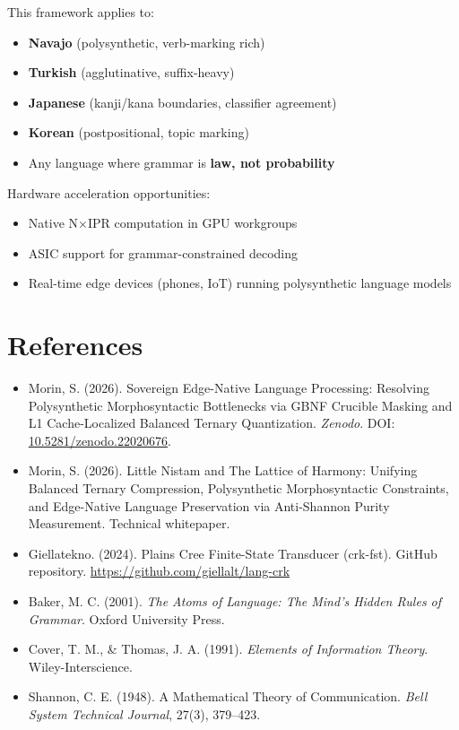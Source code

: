\documentclass[11pt,oneside]{article}
\begin{document}
This framework applies to:
\begin{itemize}
  \item \textbf{Navajo} (polysynthetic, verb-marking rich)
  \item \textbf{Turkish} (agglutinative, suffix-heavy)
  \item \textbf{Japanese} (kanji/kana boundaries, classifier agreement)
  \item \textbf{Korean} (postpositional, topic marking)
  \item Any language where grammar is \textbf{law, not probability}
\end{itemize}

Hardware acceleration opportunities:
\begin{itemize}
  \item Native N×IPR computation in GPU workgroups
  \item ASIC support for grammar-constrained decoding
  \item Real-time edge devices (phones, IoT) running polysynthetic language models
\end{itemize}

\section*{References}

\begin{itemize}
  \item Morin, S. (2026). Sovereign Edge-Native Language Processing: Resolving Polysynthetic Morphosyntactic Bottlenecks via GBNF Crucible Masking and L1 Cache-Localized Balanced Ternary Quantization. \emph{Zenodo}. DOI: \href{https://doi.org/10.5281/zenodo.22020676}{10.5281/zenodo.22020676}.
  \item Morin, S. (2026). Little Nistam and The Lattice of Harmony: Unifying Balanced Ternary Compression, Polysynthetic Morphosyntactic Constraints, and Edge-Native Language Preservation via Anti-Shannon Purity Measurement. Technical whitepaper.
  \item Giellatekno. (2024). Plains Cree Finite-State Transducer (crk-fst). GitHub repository. \url{https://github.com/giellalt/lang-crk}
  \item Baker, M. C. (2001). \emph{The Atoms of Language: The Mind's Hidden Rules of Grammar}. Oxford University Press.
  \item Cover, T. M., \& Thomas, J. A. (1991). \emph{Elements of Information Theory}. Wiley-Interscience.
  \item Shannon, C. E. (1948). A Mathematical Theory of Communication. \emph{Bell System Technical Journal}, 27(3), 379--423.
\end{itemize}
\end{document}
